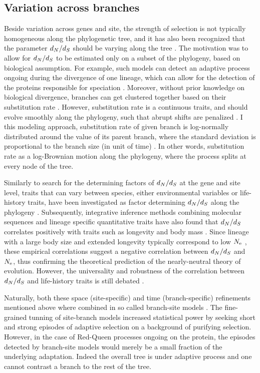 \subsection{Variation across branches}

Beside variation across genes and site, the strength of selection is not typically homogeneous along the phylogenetic tree, and it has also been recognized that the parameter $d_N / d_S$ should be varying along the tree \citep{Yang1998}.
The motivation was to allow for $d_N / d_S$ to be estimated only on a subset of the phylogeny, based on biological assumption.
For example, such models can detect an adaptive process ongoing during the divergence of one lineage, which can allow for the detection of the proteins responsible for speciation \citep{Yang2001, Zhang2004}.
Moreover, without prior knowledge on biological divergence, branches can get clustered together based on their substitution rate  \citep{Dutheil2012a}.
However, substitution rate is a continuous traits, and should evolve smoothly along the phylogeny, such that abrupt shifts are penalized \citep{Huelsenbeck2003,Seo2004}.
I this modeling approach, substitution rate of given branch is log-normally distributed around the value of its parent branch, where the standard deviation is proportional to the branch size (in unit of time) \citep{Lartillot2011, Brevet2019}.
In other words, substitution rate as a log-Brownian motion along the phylogeny, where the process splits at every node of the tree. 

Similarly to search for the determining factors of $d_N / d_S$ at the gene and site level, traits that can vary between species, either environmental variables or life-history traits, have been investigated as factor determining $d_N / d_S$ along the phylogeny \citep{Felsenstein1985,Romiguier2014}.
Subsequently, integrative inference methods combining molecular sequences and lineage specific quantitative traits have also found that $d_N / d_S$ correlates positively with traits such as longevity and body mass \citep{Lartillot2011, Figuet2017}.
Since lineage with a large body size and extended longevity typically correspond to low $N_{\textrm{e}}$ \citep{Romiguier2014}, these empirical correlations suggest a negative correlation between $d_N / d_S$ and $N_{\textrm{e}}$, thus confirming the theoretical prediction of the nearly-neutral theory of evolution.
However, the universality and robustness of the correlation between $d_N / d_S$ and life-history traits is still debated \citep{Nabholz2013, Lanfear2014, Figuet2016}.

Naturally, both these space (site-specific) and time (branch-specific) refinements mentioned above where combined in so called branch-site models \citep{Yang2002, Zhang2004, Pond2011}.
The fine-grained tunning of site-branch models increased statistical power by seeking short and strong episodes of adaptive selection on a background of purifying selection.
However, in the case of Red-Queen processes ongoing on the protein, the episodes detected by branch-site models would merely be a small fraction of the underlying adaptation.
Indeed the overall tree is under adaptive process and one cannot contrast a branch to the rest of the tree.

